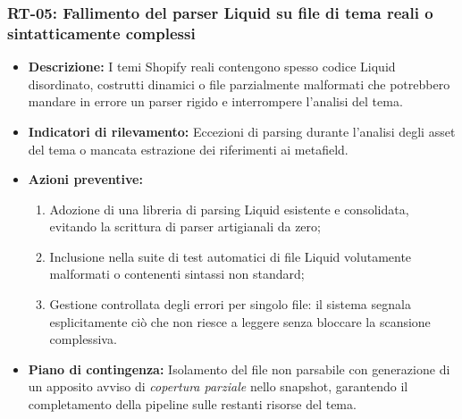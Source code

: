 \subsubsection{RT-05: Fallimento del parser Liquid su file di tema reali o sintatticamente complessi}
\begin{itemize}
    \item \textbf{Descrizione:} I temi Shopify reali contengono spesso codice Liquid disordinato, costrutti dinamici o file parzialmente malformati che potrebbero mandare in errore un parser rigido e interrompere l'analisi del tema.
    \item \textbf{Indicatori di rilevamento:} Eccezioni di parsing durante l'analisi degli asset del tema o mancata estrazione dei riferimenti ai metafield.
    \item \textbf{Azioni preventive:}
    \begin{enumerate}
        \item Adozione di una libreria di parsing Liquid esistente e consolidata, evitando la scrittura di parser artigianali da zero;
        \item Inclusione nella suite di test automatici di file Liquid volutamente malformati o contenenti sintassi non standard;
        \item Gestione controllata degli errori per singolo file: il sistema segnala esplicitamente ciò che non riesce a leggere senza bloccare la scansione complessiva.
    \end{enumerate}
    \item \textbf{Piano di contingenza:} Isolamento del file non parsabile con generazione di un apposito avviso di \textit{copertura parziale} nello snapshot, garantendo il completamento della pipeline sulle restanti risorse del tema.
\end{itemize}

